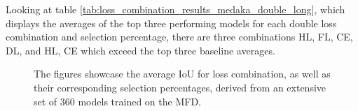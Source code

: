 Looking at table \ref{tab:loss_combination_results_medaka_double_long}, which displays the averages of the top three performing models for each double loss combination and selection percentage, there are three combinations HL, FL, CE, DL, and HL, CE which exceed the top three baseline averages. 
\begin{figure}[H]%
  \centering
  \caption[Average IoU for Loss Combination (Medaka)]{The figures showcase the average \ac{IoU} for loss combination, as well as their corresponding selection percentages, derived from an extensive set of 360 models trained on the \ac{MFD}.}
  \label{loss_combination_results_medaka_short}
\end{figure}

